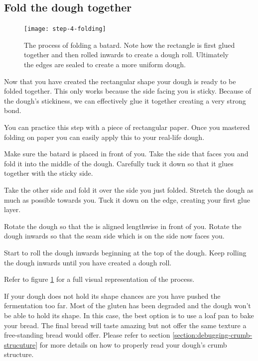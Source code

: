 \subsection[Folding]{Fold the dough together}

\begin{figure}[htb!]
  \texttt{[image: step-4-folding]}
  \caption{The process of folding a batard. Note how the rectangle is first glued
  together and then rolled inwards to create a dough roll. Ultimately the edges
  are sealed to create a more uniform dough.}
  \label{fig:shaping-folding}
\end{figure}

Now that you have created the rectangular shape your dough
is ready to be folded together. This only works because the side
facing you is sticky. Because of the dough's stickiness,
we can effectively glue it together creating a very
strong bond.

You can practice this step with a piece of rectangular paper.
Once you mastered folding on paper you can easily apply
this to your real-life dough.

Make sure the batard is placed in front of you. Take the side
that faces you and fold it into the middle of the dough. Carefully
tuck it down so that it glues together with the sticky side.

Take the other side and fold it over the side you just folded.
Stretch the dough as much as possible towards you. Tuck it down
on the edge, creating your first glue layer.

Rotate the dough so that the is aligned lengthwise in front of you.
Rotate the dough inwards so that the seam side which is on the side
now faces you.

Start to roll the dough inwards beginning at the top of the dough.
Keep rolling the dough inwards until you have created a dough roll.

Refer to figure \ref{fig:shaping-folding} for a full visual
representation of the process.

If your dough does not hold its shape chances are you have pushed
the fermentation too far. Most of the gluten has been degraded
and the dough won't be able to hold its shape. In this case,
the best option is to use a loaf pan to bake your bread. The
final bread will taste amazing but not offer the same texture
a free-standing bread would offer. Please refer to
section \ref{section:debugging-crumb-strucuture} for more
details on how to properly read your dough's crumb structure.

